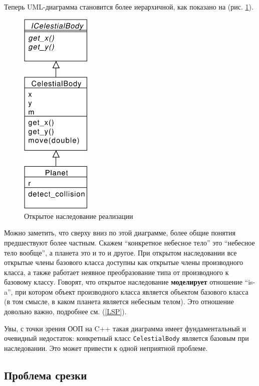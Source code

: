 \documentclass[a4paper,12pt,oneside]{book}
\begin{document}
Теперь UML-диаграмма становится более иерархичной, как показано на (рис. \ref{fig:inheritance-implementation}).

\begin{figure}[h!]
\centering
\includegraphics[width=0.3\textwidth]{illustrations/impl-inheritance-crop.pdf}
\caption{Открытое наследование реализации}
\label{fig:inheritance-implementation}
\end{figure}

Можно заметить, что сверху вниз по этой диаграмме, более общие понятия предшествуют более частным. Скажем ``конкретное небесное тело'' это ``небесное тело вообще'', а планета это и то и другое. При открытом наследовании все открытые члены базового класса доступны как открытые члены производного класса, а также работает неявное преобразование типа от производного к базовому классу. Говорят, что открытое наследование \textbf{моделирует} отношение ``is-a'', при котором объект производного класса является объектом базового класса (в том смысле, в каком планета является небесным телом). Это отношение довольно важно, подробнее см. (\ref{LSP}).

Увы, с точки зрения ООП на C++ такая диаграмма имеет фундаментальный и очевидный недостаток: конкретный класс \lstinline!CelestialBody! является базовым при наследовании. Это может привести к одной неприятной проблеме.

\subsection{Проблема срезки}\label{Cutting}
\end{document}
